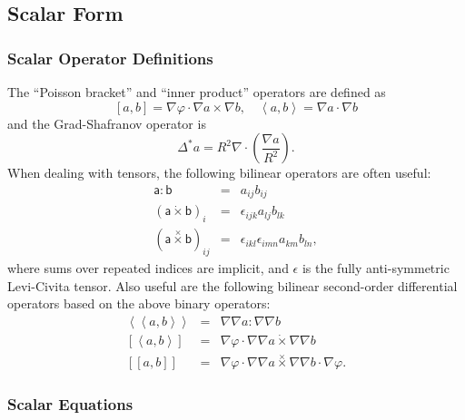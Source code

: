 \documentclass[letterpaper]{book}
\newcommand{\tensor}[1]{\mathsf{#1}}
\newcommand{\tor}{\varphi}              %
\newcommand{\grad}[1]{\nabla #1}
\renewcommand{\div}[1]{\nabla \cdot #1}
\newcommand{\dotdot}{:}
\newcommand{\dottimes}{\dot\times}
\newcommand{\timestimes}{\stackrel{\times}{\times}}
\newcommand{\gs}[1]{\Delta^* #1}
\newcommand{\pb}[2]{\left[#1,#2\right]}
\newcommand{\ip}[2]{\left\langle  #1,#2\right\rangle}
\newcommand{\funcss}[2]{
  \left\langle\left\langle #1,#2 \right\rangle\right\rangle}
\newcommand{\funcsa}[2]{\left[\left\langle #1,#2 \right\rangle\right]}
\newcommand{\funcaa}[2]{\left[\left[ #1,#2 \right]\right]}
\begin{document}
\subsection{Scalar Form}

\subsubsection{Scalar Operator Definitions}

The ``Poisson bracket'' and ``inner product'' operators
are defined as
\[ 
\pb{a}{b} = \nabla \tor \cdot \grad{a} \times \grad{b}, 
\quad
\ip{a}{b} = \grad{a} \cdot \grad{b}
\]
and the Grad-Shafranov operator is
\[
\gs{a} = R^2 \div{\left(\frac{\grad{a}}{R^2}\right)}.
\]
When dealing with tensors, the following bilinear operators are often
useful:
\begin{eqnarray*}
  \tensor{a} \dotdot \tensor{b} & = & a_{i j} b_{i j}
  \\
  (\tensor{a} \dottimes \tensor{b})_i & = & \epsilon_{i j k}
  a_{l j} b_{l k}
  \\
  (\tensor{a} \timestimes \tensor{b})_{i j} & = & 
  \epsilon_{i k l} \epsilon_{i m n} a_{k m} b_{l n},
\end{eqnarray*}
where sums over repeated indices are implicit, and $\tensor{\epsilon}$
is the fully anti-symmetric Levi-Civita tensor.  Also useful are the
following bilinear second-order differential operators based on the
above binary operators:
\begin{eqnarray*}
  \funcss{a}{b} & = & \grad{\grad{a}} \dotdot \grad{\grad{b}} \\
  \funcsa{a}{b} & = & \grad{\tor} \cdot 
  \grad{\grad{a}} \dottimes \grad{\grad{b}}\\
  \funcaa{a}{b} & = & \grad{\tor} \cdot 
       \grad{\grad{a}} \timestimes \grad{\grad{b}}
       \cdot \grad{\tor}.
\end{eqnarray*}

\subsubsection{Scalar Equations}
\end{document}
